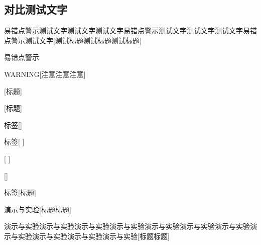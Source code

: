 \documentclass[color=green]{textbook-cn}%
\begin{document}
\begin{Project}
\subsection*{对比测试文字}

\begin{box1}{易错点警示测试文字测试文字测试文字易错点警示测试文字测试文字测试文字易错点警示测试文字}[测试标题测试标题测试标题]
\lipsum[2]
\end{box1}


\begin{box1}{易错点警示}
\lipsum[2]
\end{box1}

\begin{Warning}
	\lipsum[2]
\end{Warning}


\begin{box1}{WARNING}[注意注意注意]
	\lipsum[2]
\end{box1}


\begin{box1}{}[标题]
	\lipsum[2][1-3]
\end{box1}

\begin{box1}{ }[标题]
	\lipsum[2][1-3]
\end{box1}

\begin{box1}{标签}[]
	\lipsum[2][1-3]
\end{box1}

\begin{box1}{标签}[ ]
	\lipsum[2][1-3]
\end{box1}

\begin{box1}{ }[ ]
	\lipsum[2][1-3]
\end{box1}

\begin{box1}{}[]
	\lipsum[2][1-3]
\end{box1}

\begin{box1}{标签}[标题]
	\lipsum[2][1-3]
\end{box1}




\begin{box2}{演示与实验}[标题标题]
	\lipsum[2]
\end{box2}


\begin{box2}{演示与实验演示与实验演示与实验演示与实验演示与实验演示与实验演示与实验演示与实验演示与实验演示与实验演示与实验}[标题标题]
	\lipsum[2]
\end{box2}


\end{Project}
\end{document}
